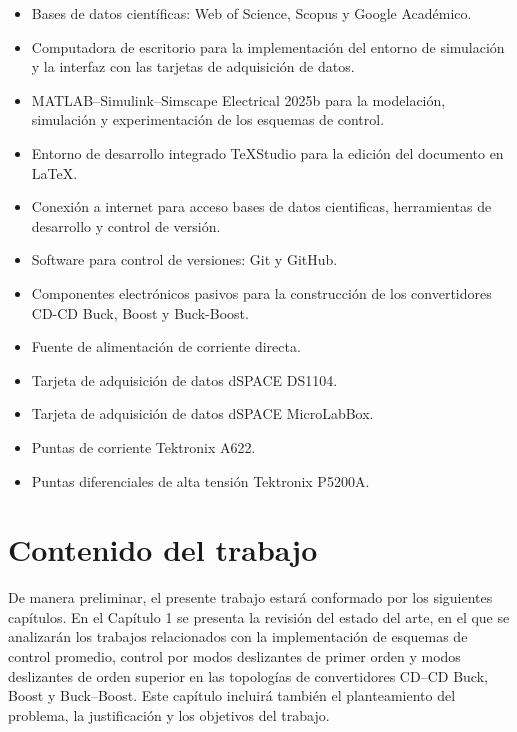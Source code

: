 \documentclass[12pt,oneside,openany]{book}
\begin{document}
\begin{itemize}
\item Bases de datos científicas: Web of Science, Scopus y Google Académico.

\item Computadora de escritorio para la implementación del entorno de simulación y la interfaz con las tarjetas de adquisición de datos.

\item MATLAB–Simulink–Simscape Electrical 2025b para la modelación, simulación y experimentación de los esquemas de control.

\item Entorno de desarrollo integrado TeXStudio para la edición del documento en \LaTeX.

\item Conexión a internet para acceso bases de datos cientificas, herramientas de desarrollo y control de versión.

\item Software para control de versiones: Git y GitHub.

\item Componentes electrónicos pasivos para la construcción de los convertidores CD-CD Buck, Boost y Buck-Boost.

\item Fuente de alimentación de corriente directa.

\item Tarjeta de adquisición de datos dSPACE DS1104.

\item Tarjeta de adquisición de datos dSPACE MicroLabBox.

\item Puntas de corriente Tektronix A622.

\item Puntas diferenciales de alta tensión Tektronix P5200A.
\end{itemize}

\section{Contenido del trabajo}
 De manera preliminar, el presente trabajo estará conformado por los siguientes capítulos.
 En el Capítulo 1 se presenta la revisión del estado del arte, en el que se analizarán los trabajos relacionados con la implementación de esquemas de control promedio, control por modos deslizantes de primer orden y modos deslizantes de orden superior en las topologías de convertidores CD–CD Buck, Boost y Buck–Boost. Este capítulo incluirá también el planteamiento del problema, la justificación y los objetivos del trabajo.
 
\end{document}
